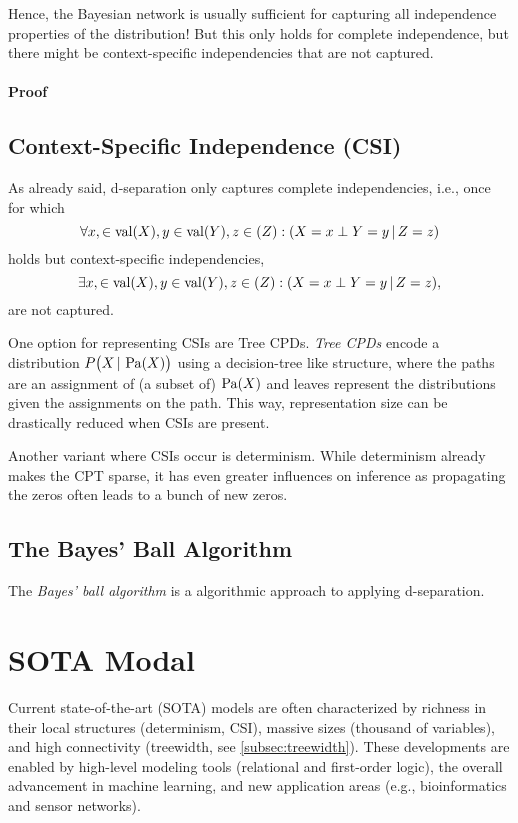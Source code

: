 				Hence, the Bayesian network is usually sufficient for capturing all independence properties of the distribution! But this only holds for complete independence, but there might be context-specific independencies that are not captured.

				\paragraph{Proof}

		\subsection{Context-Specific Independence (CSI)}
			As already said, d-separation only captures complete independencies, i.e., once for which
			\begin{equation}
				\forall x, \in \operatorname{val}(X), y \in \operatorname{val}(Y), z \in (Z) : (X = x \perp Y = y \,\vert\, Z = z)
			\end{equation}
			holds but context-specific independencies,
			\begin{equation}
				\exists x, \in \operatorname{val}(X), y \in \operatorname{val}(Y), z \in (Z) : (X = x \perp Y = y \,\vert\, Z = z),
			\end{equation}
			are not captured.

			One option for representing CSIs are Tree CPDs. \emph{Tree CPDs} encode a distribution \( P\bigl(X \,\vert\, \operatorname{Pa}(X) \bigr) \) using a decision-tree like structure, where the paths are an assignment of (a subset of) \( \operatorname{Pa}(X) \) and leaves represent the distributions given the assignments on the path. This way, representation size can be drastically reduced when CSIs are present.

			Another variant where CSIs occur is determinism. While determinism already makes the CPT sparse, it has even greater influences on inference as propagating the zeros often leads to a bunch of new zeros.

		\subsection{The Bayes' Ball Algorithm}
			The \emph{Bayes' ball algorithm} is a algorithmic approach to applying d-separation.

	\section{SOTA Modal}
		Current state-of-the-art (SOTA) models are often characterized by richness in their local structures (determinism, CSI), massive sizes (thousand of variables), and high connectivity (treewidth, see \autoref{subsec:treewidth}). These developments are enabled by high-level modeling tools (relational and first-order logic), the overall advancement in machine learning, and new application areas (e.g., bioinformatics and sensor networks).

